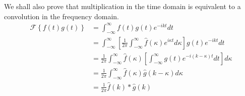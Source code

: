 \documentclass{report}
\theoremstyle{definition}
\theoremstyle{remark}
\newcommand{\ft}[1]{\mathscr{F}\left\{ #1\right\}}
\begin{document}
We shall also prove that multiplication in the time domain is equivalent to a convolution in the frequency domain.
\begin{equation*}
    \begin{split}
        \ft{f(t)g(t)}&=\int^\infty_{-\infty}f(t)g(t)e^{-ikt}dt \\
        &=\int^\infty_{-\infty}\left[ \frac{1}{2\pi}\int^\infty_{-\infty}\hat{f}(\kappa)e^{i\kappa t}d\kappa \right] g(t)e^{-ikt}dt\\
        &=\frac{1}{2\pi}\int^\infty_{-\infty}\hat{f}(\kappa) \left[\int^\infty_{-\infty}g(t)e^{-i(k-\kappa)t}dt \right] d\kappa \\
        &= \frac{1}{2\pi}\int^\infty_{-\infty}\hat{f}(\kappa) \hat{g}(k-\kappa)d\kappa \\
        &=\frac{1}{2\pi}\hat{f}(k)*\hat{g}(k)
    \end{split}
\end{equation*}
\end{document}
